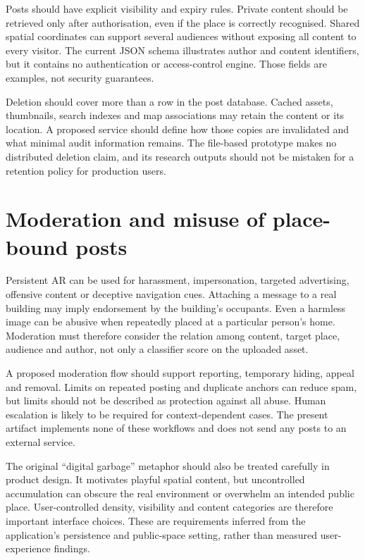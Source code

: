 Posts should have explicit visibility and expiry rules. Private content should be retrieved only after authorisation, even if the place is correctly recognised. Shared spatial coordinates can support several audiences without exposing all content to every visitor. The current JSON schema illustrates author and content identifiers, but it contains no authentication or access-control engine. Those fields are examples, not security guarantees.

Deletion should cover more than a row in the post database. Cached assets, thumbnails, search indexes and map associations may retain the content or its location. A proposed service should define how those copies are invalidated and what minimal audit information remains. The file-based prototype makes no distributed deletion claim, and its research outputs should not be mistaken for a retention policy for production users.

\section{Moderation and misuse of place-bound posts}
Persistent AR can be used for harassment, impersonation, targeted advertising, offensive content or deceptive navigation cues. Attaching a message to a real building may imply endorsement by the building's occupants. Even a harmless image can be abusive when repeatedly placed at a particular person's home. Moderation must therefore consider the relation among content, target place, audience and author, not only a classifier score on the uploaded asset.

A proposed moderation flow should support reporting, temporary hiding, appeal and removal. Limits on repeated posting and duplicate anchors can reduce spam, but limits should not be described as protection against all abuse. Human escalation is likely to be required for context-dependent cases. The present artifact implements none of these workflows and does not send any posts to an external service.

The original ``digital garbage'' metaphor should also be treated carefully in product design. It motivates playful spatial content, but uncontrolled accumulation can obscure the real environment or overwhelm an intended public place. User-controlled density, visibility and content categories are therefore important interface choices. These are requirements inferred from the application's persistence and public-space setting, rather than measured user-experience findings.

